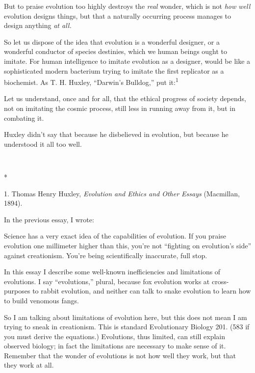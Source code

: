 {
 But to praise evolution too highly destroys the \textit{real}
wonder, which is not \textit{how well} evolution designs things, but
that a naturally occurring process manages to design anything
\textit{at all.}}

{
 So let us dispose of the idea that evolution is a wonderful
designer, or a wonderful conductor of species destinies, which we human
beings ought to imitate. For human intelligence to imitate evolution as
a designer, would be like a sophisticated modern bacterium trying to
imitate the first replicator as a biochemist. As T. H. Huxley,
``Darwin's
Bulldog,'' put it:\textsuperscript{1}}

{
 Let us understand, once and for all, that the ethical progress of
society depends, not on imitating the cosmic process, still less in
running away from it, but in combating it.}

{
 Huxley didn't say that because he disbelieved in
evolution, but because he understood it all too well.}

{\centering
 \ ~
\par}

{\centering
 *
\par}


\bigskip

{
 1. Thomas Henry Huxley, \textit{Evolution and Ethics and Other
Essays} (Macmillan, 1894).}


{
 In the previous essay, I wrote:}

{
 Science has a very exact idea of the capabilities of evolution. If
you praise evolution one millimeter higher than this,
you're not ``fighting on
evolution's side'' against
creationism. You're being scientifically inaccurate,
full stop.}

{
 In this essay I describe some well-known inefficiencies and
limitations of evolutions. I say
``evolutions,'' plural, because fox
evolution works at cross-purposes to rabbit evolution, and neither can
talk to snake evolution to learn how to build venomous fangs.}

{
 So I am talking about limitations of evolution here, but this does
not mean I am trying to sneak in creationism. This is standard
Evolutionary Biology 201. (583 if you must derive the equations.)
Evolutions, thus limited, can still explain observed biology; in fact
the limitations are necessary to make sense of it. Remember that the
wonder of evolutions is not how well they work, but that they work at
all.}

